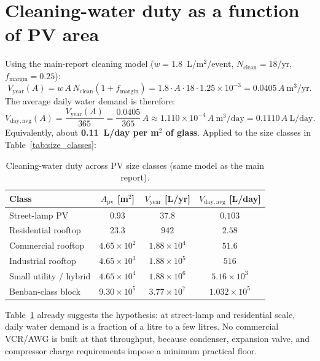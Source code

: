 \documentclass[11pt,a4paper]{article}
\begin{document}
\section{Cleaning-water duty as a function of PV area}
Using the main-report cleaning model ($w=1.8$~L/m$^2$/event, $N_{\mathrm{clean}}=18$/yr, $f_{\mathrm{margin}}=0.25$):
\begin{equation}
V_{\mathrm{year}}(A)=w\,A\,N_{\mathrm{clean}}(1+f_{\mathrm{margin}})
=1.8\cdot A\cdot 18\cdot 1.25\times 10^{-3}
=0.0405\,A\ \mathrm{m^3/yr}.
\end{equation}
The average daily water demand is therefore:
\begin{equation}
V_{\mathrm{day,avg}}(A)=\frac{V_{\mathrm{year}}(A)}{365}
=\frac{0.0405}{365}\,A
\approx 1.110\times 10^{-4}\,A\ \mathrm{m^3/day}
=0.1110\,A\ \mathrm{L/day}.
\end{equation}
Equivalently, about \textbf{0.11~L/day per m$^2$ of glass}. Applied to the size classes in Table~\ref{tab:size_classes}:
\begin{table}[h]
\centering
\caption{Cleaning-water duty across PV size classes (same model as the main report).}
\begin{tabular}{@{}lccc@{}}
\toprule
\textbf{Class} & \textbf{$A_{\mathrm{pv}}$ [m$^2$]} & \textbf{$V_{\mathrm{year}}$ [L/yr]} & \textbf{$V_{\mathrm{day,avg}}$ [L/day]} \\
\midrule
Street-lamp PV         & 0.93                  & $37.8$                & $0.103$ \\
Residential rooftop    & 23.3                  & $942$                 & $2.58$  \\
Commercial rooftop     & $4.65\times 10^{2}$   & $1.88\times 10^{4}$   & $51.6$  \\
Industrial rooftop     & $4.65\times 10^{3}$   & $1.88\times 10^{5}$   & $516$   \\
Small utility / hybrid & $4.65\times 10^{4}$   & $1.88\times 10^{6}$   & $5.16\times 10^{3}$ \\
Benban-class block     & $9.30\times 10^{5}$   & $3.77\times 10^{7}$   & $1.032\times 10^{5}$ \\
\bottomrule
\end{tabular}
\label{tab:duty_vs_scale}
\end{table}

Table~\ref{tab:duty_vs_scale} already suggests the hypothesis: at street-lamp and residential scale, daily water demand is a fraction of a litre to a few litres. No commercial VCR/AWG is built at that throughput, because condenser, expansion valve, and compressor charge requirements impose a minimum practical floor.
\end{document}
